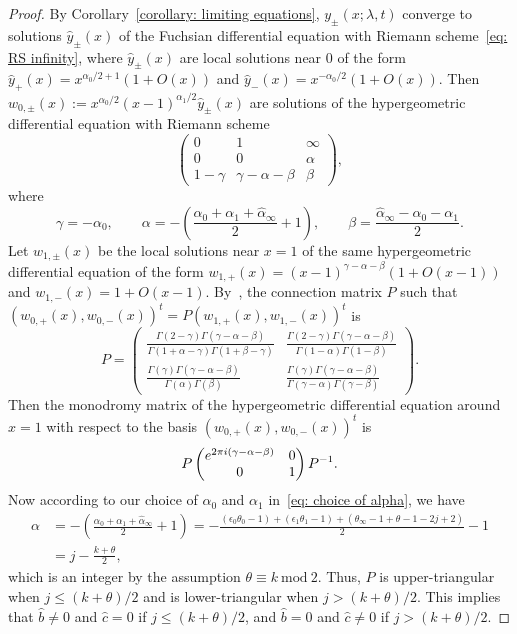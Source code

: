 \documentclass[11pt]{article}
\numberwithin{equation}{section}
\numberwithin{equation}{section}
\def\mod{\ \mathrm{mod}\ }
\def\M#1#2#3#4{\begin{pmatrix}#1&#2\\#3&#4\end{pmatrix}}
\begin{document}
\begin{proof} By Corollary~\ref{corollary: limiting equations},
 $y_\pm(x;\lambda,t)$ converge to solutions $\hat y_\pm(x)$ of the
 Fuchsian differential equation with Riemann scheme~\eqref{eq: RS
 infinity}, where $\hat y_\pm(x)$ are local solutions near $0$ of
 the form $\hat y_+(x)=x^{\alpha_0/2+1}(1+O(x))$ and $\hat
 y_-(x)=x^{-\alpha_0/2}(1+O(x))$. Then
 $w_{0,\pm}(x):=x^{\alpha_0/2}(x-1)^{\alpha_1/2}\hat
 y_\pm(x)$ are solutions of the hypergeometric differential equation
 with Riemann scheme
\[
 \begin{pmatrix} 0 & 1 & \infty \\
 0 & 0 & \alpha \\
 1-\gamma & \gamma-\alpha-\beta & \beta\end{pmatrix},
\]
 where
\[
 \gamma=-\alpha_0, \qquad
 \alpha=-\left(\frac{\alpha_0+\alpha_1+\hat\alpha_\infty}2+1\right),
 \qquad
 \beta=\frac{\hat\alpha_\infty-\alpha_0-\alpha_1}2.
\]
 Let $w_{1,\pm}(x)$ be the local solutions near $x=1$ of the same
 hypergeometric differential equation of the form
 $w_{1,+}(x)=(x-1)^{\gamma-\alpha-\beta}(1+O(x-1))$ and
 $w_{1,-}(x)=1+O(x-1)$. By~\cite[Chapter~2, Theorem~4.7.1]{Yoshida}, the connection matrix $P$ such that
 $(w_{0,+}(x),w_{0,-}(x))^t=P{(w_{1,+}(x),w_{1,-}(x))^t}$ is
\[
 P=\begin{pmatrix}
 \displaystyle
 \frac{\Gamma(2-\gamma)\Gamma(\gamma-\alpha-\beta)}
 {\Gamma(1+\alpha-\gamma)\Gamma(1+\beta-\gamma)} &
 \displaystyle
 \frac{\Gamma(2-\gamma)\Gamma(\gamma-\alpha-\beta)}
 {\Gamma(1-\alpha)\Gamma(1-\beta)} \\[10pt]
 \displaystyle
 \frac{\Gamma(\gamma)\Gamma(\gamma-\alpha-\beta)}
 {\Gamma(\alpha)\Gamma(\beta)} &
 \displaystyle\frac{\Gamma(\gamma)\Gamma(\gamma-\alpha-\beta)}
 {\Gamma(\gamma-\alpha)\Gamma(\gamma-\beta)} \end{pmatrix}.
\]
 Then the monodromy matrix of the hypergeometric differential
 equation around $x=1$ with respect to the basis
 $(w_{0,+}(x),w_{0,-}(x))^t$ is
\[
 P\M{{\rm e}^{2\pi {\rm i}(\gamma-\alpha-\beta)}}001P^{-1}.
\]
 Now according to our choice of $\alpha_0$ and $\alpha_1$ in~\eqref{eq: choice of alpha}, we have
 \begin{align*}
 \alpha&{}=-\left(\frac{\alpha_0+\alpha_1+\hat\alpha_\infty}2
 +1\right)
=-\frac{(\epsilon_0\theta_0-1)+(\epsilon_1\theta_1-1)
 +(\theta_\infty-1+\theta-1-2j+2)}2-1 \\
 &{}=j-\frac{k+\theta}2,
 \end{align*}
 which is an integer by the assumption $\theta\equiv k\mod 2$.
 Thus, $P$ is upper-triangular when $j\le(k+\theta)/2$ and is
 lower-triangular when $j>(k+\theta)/2$. This implies that $\hat
 b\neq0$ and $\hat c=0$ if $j\le(k+\theta)/2$, and $\hat b=0$ and
 $\hat c\neq 0$ if $j>(k+\theta)/2$.
\end{proof}
\end{document}
